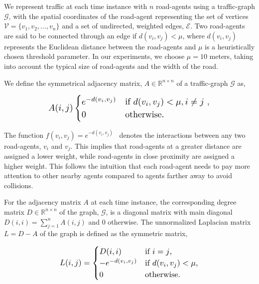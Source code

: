 \documentclass[10pt,twocolumn,letterpaper]{article}
\newcommand{\mc}[1]{\mathcal{#1}}
\theoremstyle{plain}
\begin{document}
We represent traffic at each time instance with $n$ road-agents using a traffic-graph $\mc{G}$, with the spatial coordinates of the road-agent representing the set of vertices $\mc{V} = \{ v_1, v_2, \dots, v_n \}$ and a set of undirected, weighted edges, $\mc{E}$. Two road-agents are said to be connected through an edge if $d(v_i,v_j) < \mu$, where $d(v_i,v_j)$ represents the Euclidean distance between the road-agents and $\mu$ is a heuristically chosen threshold parameter. In our experiments, we choose $\mu=10$ meters, taking into account the typical size of road-agents and the width of the road. 

We define the symmetrical adjacency matrix, $A \in \mathbb{R}^{n \times n}$ of a traffic-graph $\mc{G}$ as,

\begin{equation}
\resizebox{0.7\columnwidth}{!}{
$A(i,j)
     \begin{cases}
       e^{-d(v_i,v_j)}  & \text{if $d(v_i,v_j) < \mu,i \neq j$ },\\
0 &\text{otherwise.}
     \end{cases}$
     }
     \label{eq: similarity_function}
\end{equation}

\noindent The function $f(v_i,v_j) = e^{-d(v_i,v_j)}$~\cite{belkin2003laplacian} denotes the interactions between any two road-agents, $v_i$ and $v_j$. This implies that road-agents at a greater distance are assigned a lower weight, while road-agents in close proximity are assigned a higher weight. This follows the intuition that each road-agent needs to pay more attention to other nearby agents compared to agents farther away to avoid collisions.



For the adjacency matrix $A$ at each time instance, the corresponding degree matrix $D \in \mathbb{R}^{n \times n}$ of the graph, $\mc{G}$, is a diagonal matrix with main diagonal $D(i, i) = \sum_{j=1}^n A(i, j)$ and 0 otherwise. The unnormalized Laplacian matrix $L  = D  - A$ of the graph is defined as the symmetric matrix,

\begin{equation}
\resizebox{0.6\columnwidth}{!}{
$L(i,j) =
     \begin{cases}
       D(i,i)  &\text{if $i=j$},\\
      -e^{-d(v_i,v_j)} &\text{if $d(v_i,v_j) < \mu$}, \\
      0 &\text{otherwise.}
     \end{cases}$
     }
\end{equation}
\end{document}
